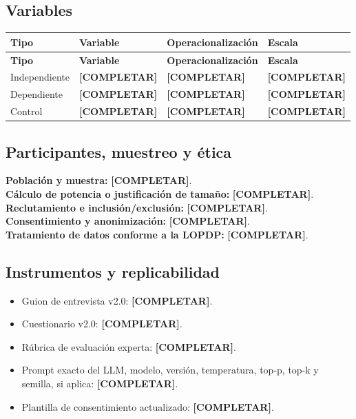 \documentclass[12pt,journal,onecolumn]{IEEEtran}
\newcommand{\completar}{\textcolor{red!70!black}{\textbf{[COMPLETAR]}}}
\begin{document}
\subsection{Variables}
\begin{longtable}{P{0.20\textwidth}P{0.25\textwidth}P{0.30\textwidth}P{0.18\textwidth}}\toprule
\textbf{Tipo} & \textbf{Variable} & \textbf{Operacionalización} & \textbf{Escala}\\\midrule\endfirsthead
\toprule\textbf{Tipo} & \textbf{Variable} & \textbf{Operacionalización} & \textbf{Escala}\\\midrule\endhead
Independiente & \completar & \completar & \completar\\
Dependiente & \completar & \completar & \completar\\
Control & \completar & \completar & \completar\\\bottomrule
\end{longtable}

\subsection{Participantes, muestreo y ética}
\textbf{Población y muestra:} \completar.\\
\textbf{Cálculo de potencia o justificación de tamaño:} \completar.\\
\textbf{Reclutamiento e inclusión/exclusión:} \completar.\\
\textbf{Consentimiento y anonimización:} \completar.\\
\textbf{Tratamiento de datos conforme a la LOPDP:} \completar.

\subsection{Instrumentos y replicabilidad}
\begin{itemize}
\item Guion de entrevista v2.0: \completar.
\item Cuestionario v2.0: \completar.
\item Rúbrica de evaluación experta: \completar.
\item Prompt exacto del LLM, modelo, versión, temperatura, top-p, top-k y semilla, si aplica: \completar.
\item Plantilla de consentimiento actualizado: \completar.
\end{itemize}
\end{document}
